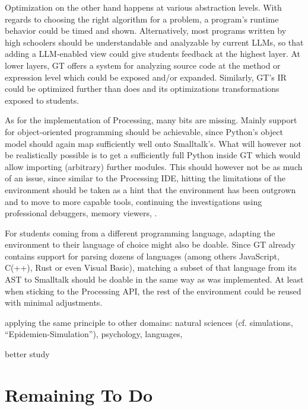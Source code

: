 Optimization on the other hand happens at various abstraction levels. With regards to choosing the right algorithm for a problem, a program's runtime behavior could be timed and shown. Alternatively, most programs written by high schoolers should be understandable and analyzable by current \acp{LLM}, so that adding a \ac{LLM}-enabled view could give students feedback at the highest layer. At lower layers, \ac{GT} offers a  system for analyzing source code at the method or expression level which could be exposed and/or expanded. Similarly, \ac{GT}'s \ac{IR} could be optimized further than  does and its optimizations transformations exposed to students.

As for the implementation of Processing, many bits are missing. Mainly support for object-oriented programming should be achievable, since Python's object model should again map sufficiently well onto Smalltalk's. What will however not be realistically possible is to get a sufficiently full Python inside \ac{GT} which would allow importing (arbitrary) further modules. This should however not be as much of an issue, since similar to the Processing \ac{IDE}, hitting the limitations of the environment should be taken as a hint that the environment has been outgrown and to move to more capable tools, continuing the investigations using professional debuggers, memory viewers, \etc.

For students coming from a different programming language, adapting the environment to their language of choice might also be doable. Since \ac{GT} already contains support for parsing dozens of languages (among others JavaScript, C(++), Rust or even Visual Basic), matching a subset of that language from its \ac{AST} to Smalltalk should be doable in the same way as  was implemented. At least when sticking to the Processing \ac{API}, the rest of the environment could be reused with minimal adjustments.


\begin{todo}
\item applying the same principle to other domains: natural sciences (cf. simulations, \eg ``Epidemien-Simulation''), psychology, languages, \etc
\item better study
\end{todo}


\section*{Remaining To Do}


